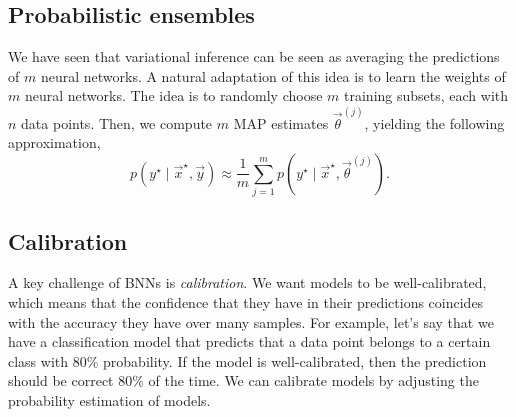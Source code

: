 \subsection{Probabilistic ensembles}

We have seen that variational inference can be seen as averaging the
predictions of $m$ neural networks. A natural adaptation of this idea is to
learn the weights of $m$ neural networks. The idea is to randomly choose $m$
training subsets, each with $n$ data points. Then, we compute $m$ MAP estimates
$\vec{\theta}^{(j)}$, yielding the following approximation, \[
  p(y^\star\mid\vec{x}^\star,\vec{y}) \approx \frac{1}{m} \sum_{j=1}^m p(y^\star\mid\vec{x}^\star,\vec{\theta}^{(j)})
.\]

\subsection{Calibration}

A key challenge of BNNs is \textit{calibration}. We want models to be
well-calibrated, which means that the confidence that they have in their
predictions coincides with the accuracy they have over many samples. For
example, let's say that we have a classification model that predicts that a
data point belongs to a certain class with $80\%$ probability. If the model is
well-calibrated, then the prediction should be correct $80\%$ of the time. We
can calibrate models by adjusting the probability estimation of models.

